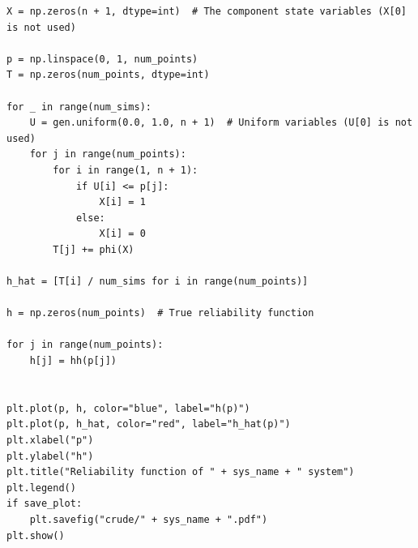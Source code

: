 \documentclass[12pt,
               a4paper,
               article,
               oneside,
               english,oldfontcommands]{memoir}
\begin{document}
\begin{lstlisting}[caption= Crude Monte Carlo Reliability (exercise i.), label={lst:crude rel prob}]
X = np.zeros(n + 1, dtype=int)  # The component state variables (X[0] is not used)

p = np.linspace(0, 1, num_points)
T = np.zeros(num_points, dtype=int)

for _ in range(num_sims):
    U = gen.uniform(0.0, 1.0, n + 1)  # Uniform variables (U[0] is not used)
    for j in range(num_points):
        for i in range(1, n + 1):
            if U[i] <= p[j]:
                X[i] = 1
            else:
                X[i] = 0
        T[j] += phi(X)

h_hat = [T[i] / num_sims for i in range(num_points)]

h = np.zeros(num_points)  # True reliability function

for j in range(num_points):
    h[j] = hh(p[j])


plt.plot(p, h, color="blue", label="h(p)")
plt.plot(p, h_hat, color="red", label="h_hat(p)")
plt.xlabel("p")
plt.ylabel("h")
plt.title("Reliability function of " + sys_name + " system")
plt.legend()
if save_plot:
    plt.savefig("crude/" + sys_name + ".pdf")
plt.show()
\end{lstlisting}
\end{document}

